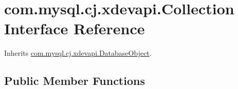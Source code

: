 \hypertarget{interfacecom_1_1mysql_1_1cj_1_1xdevapi_1_1_collection}{}\section{com.\+mysql.\+cj.\+xdevapi.\+Collection Interface Reference}
\label{interfacecom_1_1mysql_1_1cj_1_1xdevapi_1_1_collection}


Inherits \mbox{\hyperlink{interfacecom_1_1mysql_1_1cj_1_1xdevapi_1_1_database_object}{com.\+mysql.\+cj.\+xdevapi.\+Database\+Object}}.

\subsection*{Public Member Functions}
